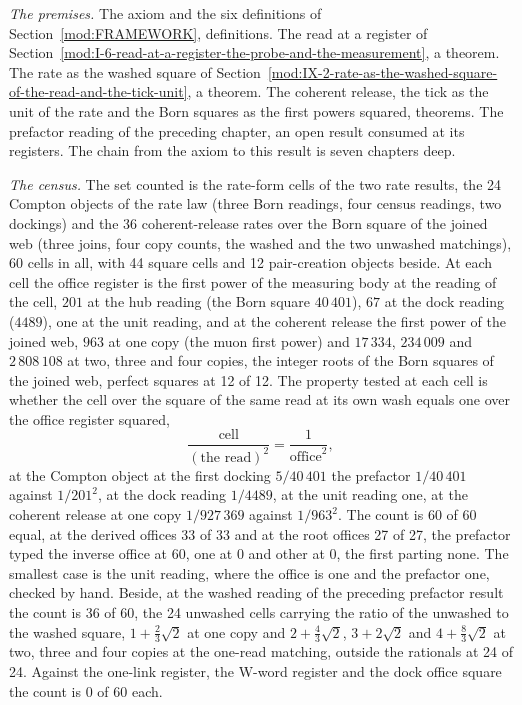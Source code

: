 \begin{chproof}
\textit{The premises.} The axiom and the six definitions of Section~\ref{mod:FRAMEWORK}, definitions. The read at a register of Section~\ref{mod:I-6-read-at-a-register-the-probe-and-the-measurement}, a theorem. The rate as the washed square of Section~\ref{mod:IX-2-rate-as-the-washed-square-of-the-read-and-the-tick-unit}, a theorem. The coherent release, the tick as the unit of the rate and the Born squares as the first powers squared, theorems. The prefactor reading of the preceding chapter, an open result consumed at its registers. The chain from the axiom to this result is seven chapters deep.

\textit{The census.} The set counted is the rate-form cells of the two rate results, the 24 Compton objects of the rate law (three Born readings, four census readings, two dockings) and the 36 coherent-release rates over the Born square of the joined web (three joins, four copy counts, the washed and the two unwashed matchings), 60 cells in all, with 44 square cells and 12 pair-creation objects beside. At each cell the office register is the first power of the measuring body at the reading of the cell, $201$ at the hub reading (the Born square $40\,401$), $67$ at the dock reading ($4489$), one at the unit reading, and at the coherent release the first power of the joined web, $963$ at one copy (the muon first power) and $17\,334$, $234\,009$ and $2\,808\,108$ at two, three and four copies, the integer roots of the Born squares of the joined web, perfect squares at 12 of 12. The property tested at each cell is whether the cell over the square of the same read at its own wash equals one over the office register squared,
\begin{equation}
\frac{\text{cell}}{(\text{the read})^{2}}=\frac{1}{\text{office}^{2}} ,
\end{equation}
at the Compton object at the first docking $5/40\,401$ the prefactor $1/40\,401$ against $1/201^{2}$, at the dock reading $1/4489$, at the unit reading one, at the coherent release at one copy $1/927\,369$ against $1/963^{2}$. The count is 60 of 60 equal, at the derived offices 33 of 33 and at the root offices 27 of 27, the prefactor typed the inverse office at 60, one at 0 and other at 0, the first parting none. The smallest case is the unit reading, where the office is one and the prefactor one, checked by hand. Beside, at the washed reading of the preceding prefactor result the count is 36 of 60, the 24 unwashed cells carrying the ratio of the unwashed to the washed square, $1+\tfrac{2}{3}\sqrt{2}$ at one copy and $2+\tfrac{4}{3}\sqrt{2}$, $3+2\sqrt{2}$ and $4+\tfrac{8}{3}\sqrt{2}$ at two, three and four copies at the one-read matching, outside the rationals at 24 of 24. Against the one-link register, the W-word register and the dock office square the count is 0 of 60 each.


\end{chproof}
